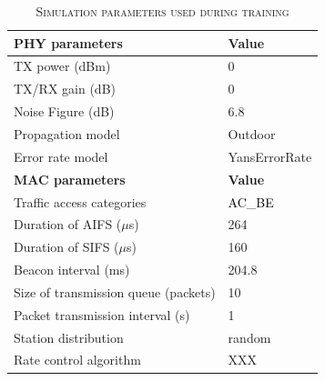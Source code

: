 \begin{table}[t]
\centering
\renewcommand{\arraystretch}{1.2}
\caption{\textsc{Simulation parameters used during training}\label{tab:ns3 parameters}}
\begin{tabular}{ll}
\hline
\textbf{PHY parameters}             & \textbf{Value}  \\
\hline
TX power (dBm)             & 0    \\
TX/RX gain (dB)                        & 0     \\
Noise Figure (dB)               & 6.8      \\  
Propagation model         & Outdoor \\ %
Error rate model               & YansErrorRate \\
\hline
\textbf{MAC parameters}               & \textbf{Value}  \\
\hline
Traffic access categories             & \textcolor{black}{ AC\_{BE} } \\
Duration of AIFS ($\mu$s)             & 264      \\
Duration of SIFS ($\mu$s)            & 160      \\
Beacon interval (ms)           & 204.8 \\
Size of transmission queue (packets)  & 10  \\
Packet transmission interval (s)        & 1  \\
Station distribution           & random  \\
Rate control algorithm                     & XXX \\
\hline
\end{tabular}
\end{table}
 

